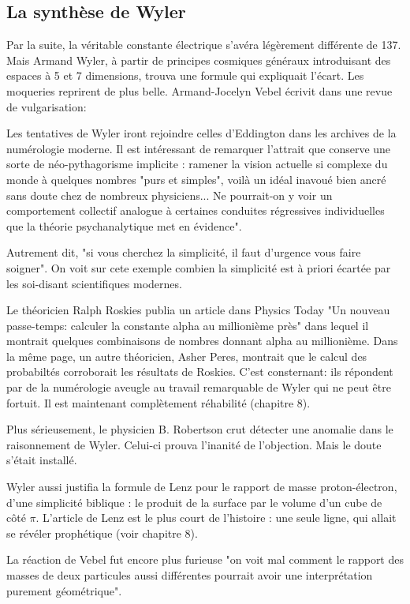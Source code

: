 \documentclass[a4paper,12pt]{article}
\begin{document}
\subsection{La synthèse de Wyler}

Par la suite, la véritable constante électrique s'avéra légèrement différente de 137. Mais Armand Wyler, à partir de principes cosmiques généraux introduisant des espaces à 5 et 7 dimensions, trouva une formule qui expliquait l'écart. Les moqueries reprirent de plus belle. Armand-Jocelyn Vebel écrivit dans une revue de vulgarisation: 

Les tentatives de Wyler iront rejoindre  celles d'Eddington dans les archives de la numérologie moderne. Il est intéressant de remarquer l'attrait que conserve une sorte de néo-pythagorisme implicite : ramener la vision actuelle si complexe du monde à quelques nombres "purs et simples", voilà un idéal inavoué bien ancré sans doute chez de nombreux physiciens... Ne pourrait-on y voir un comportement collectif analogue à certaines conduites régressives individuelles que la théorie psychanalytique met en évidence".

Autrement dit, "si vous cherchez la simplicité, il faut d'urgence vous faire soigner". On voit sur cete exemple combien la simplicité est à priori écartée par les soi-disant scientifiques modernes.

Le théoricien Ralph Roskies publia un article dans Physics Today "Un nouveau passe-temps: calculer la constante alpha au millionième près" dans lequel il montrait quelques combinaisons de nombres donnant alpha au millionième. Dans la même page, un autre théoricien, Asher Peres, montrait que le calcul des probabiltés corroborait les résultats de Roskies. C'est consternant: ils répondent par de la numérologie aveugle au travail remarquable de Wyler qui ne peut être fortuit. Il est maintenant complètement réhabilité (chapitre 8).

Plus sérieusement, le physicien B. Robertson crut détecter une anomalie dans le raisonnement de Wyler. Celui-ci prouva l'inanité de l'objection. Mais le doute s'était installé. 

Wyler aussi justifia la formule de Lenz pour le rapport de masse proton-électron, d'une simplicité biblique : le produit de la surface par le volume d'un cube de côté $\pi$. L'article de Lenz est le plus court de l'histoire : une seule ligne, qui allait se révéler prophétique (voir chapitre 8).


La réaction de Vebel fut encore plus furieuse "on voit mal comment le rapport des masses de deux particules aussi différentes pourrait avoir une interprétation purement géométrique".  
\end{document}
